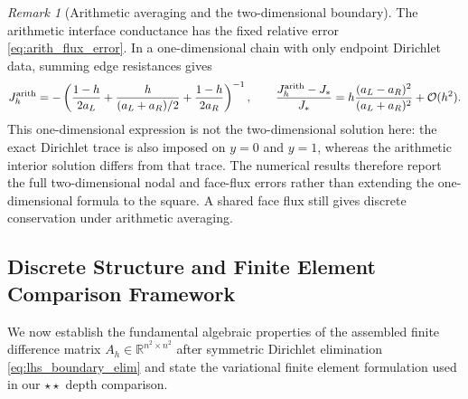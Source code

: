 \documentclass[11pt,a4paper]{article}
\theoremstyle{definition}
\theoremstyle{remark}
\newtheorem{remark}[theorem]{Remark}
\begin{document}
\begin{remark}[Arithmetic averaging and the two-dimensional boundary]\label{rem:arith_2d_boundary}
The arithmetic interface conductance has the fixed relative error
\eqref{eq:arith_flux_error}. In a one-dimensional chain with only endpoint
Dirichlet data, summing edge resistances gives
\[
J_h^{\rm arith}=-\left(\frac{1-h}{2a_L}+\frac{h}{(a_L+a_R)/2}
                 +\frac{1-h}{2a_R}\right)^{-1},\qquad
\frac{J_h^{\rm arith}-J_*}{J_*}
=h\frac{(a_L-a_R)^2}{(a_L+a_R)^2}+\mathcal O(h^2).
\]
This one-dimensional expression is not the two-dimensional solution here:
the exact Dirichlet trace is also imposed on $y=0$ and $y=1$, whereas the
arithmetic interior solution differs from that trace. The numerical results
therefore report the full two-dimensional nodal and face-flux errors rather
than extending the one-dimensional formula to the square. A shared face flux
still gives discrete conservation under arithmetic averaging.
\end{remark}

\subsection{Discrete Structure and Finite Element Comparison Framework}
We now establish the fundamental algebraic properties of the assembled finite difference matrix $A_h \in \mathbb{R}^{n^2 \times n^2}$ after symmetric Dirichlet elimination \eqref{eq:lhs_boundary_elim} and state the variational finite element formulation used in our $\star\star$ depth comparison.
\end{document}
